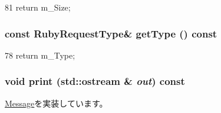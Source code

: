 \begin{DoxyCode}
81 { return m_Size; }
\end{DoxyCode}
\hypertarget{classRubyRequest_a0d40c12aa8cabb3a72487962e0b96f06}{
\subsubsection[{getType}]{\setlength{\rightskip}{0pt plus 5cm}const RubyRequestType\& getType () const}}
\label{classRubyRequest_a0d40c12aa8cabb3a72487962e0b96f06}



\begin{DoxyCode}
78 { return m_Type; }
\end{DoxyCode}
\hypertarget{classRubyRequest_ac55fe386a101fbae38c716067c9966a0}{
\subsubsection[{print}]{\setlength{\rightskip}{0pt plus 5cm}void print (std::ostream \& {\em out}) const}}
\label{classRubyRequest_ac55fe386a101fbae38c716067c9966a0}


\hyperlink{classMessage_a3ea5f7af5db62cc24f4e40df9ea5c971}{Message}を実装しています。

